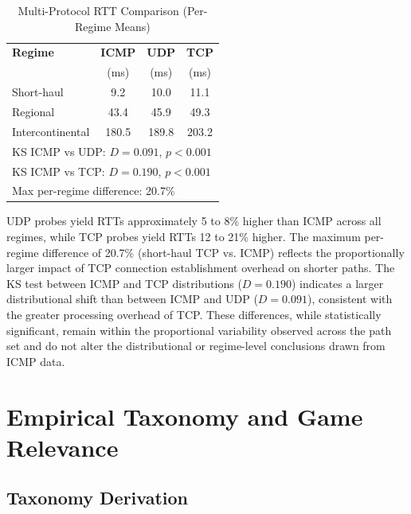 \documentclass[conference]{IEEEtran}
\begin{document}
\begin{table}[t]
\caption{Multi-Protocol RTT Comparison (Per-Regime Means)}
\label{tab:protocol}
\begin{center}
\begin{tabular}{lccc}
\toprule
\textbf{Regime} & \textbf{ICMP} & \textbf{UDP} & \textbf{TCP} \\
 & (ms) & (ms) & (ms) \\
\midrule
Short-haul & 9.2 & 10.0 & 11.1 \\
Regional & 43.4 & 45.9 & 49.3 \\
Intercontinental & 180.5 & 189.8 & 203.2 \\
\midrule
\multicolumn{4}{l}{\scriptsize KS ICMP vs UDP: $D = 0.091$, $p < 0.001$} \\
\multicolumn{4}{l}{\scriptsize KS ICMP vs TCP: $D = 0.190$, $p < 0.001$} \\
\multicolumn{4}{l}{\scriptsize Max per-regime difference: 20.7\%} \\
\bottomrule
\end{tabular}
\end{center}
\end{table}

UDP probes yield RTTs approximately 5 to 8\% higher than ICMP across all regimes, while TCP probes yield RTTs 12 to 21\% higher. The maximum per-regime difference of 20.7\% (short-haul TCP vs. ICMP) reflects the proportionally larger impact of TCP connection establishment overhead on shorter paths. The KS test between ICMP and TCP distributions ($D = 0.190$) indicates a larger distributional shift than between ICMP and UDP ($D = 0.091$), consistent with the greater processing overhead of TCP. These differences, while statistically significant, remain within the proportional variability observed across the path set and do not alter the distributional or regime-level conclusions drawn from ICMP data.

\section{Empirical Taxonomy and Game Relevance}

\subsection{Taxonomy Derivation}
\end{document}
